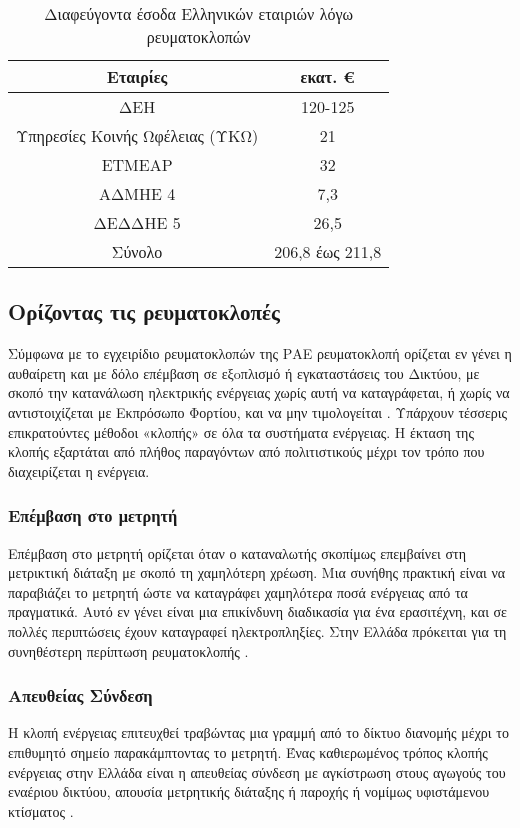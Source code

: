 \begin{table}[ht!]
\centering
\begin{tabular}{ |c||c|  }
 \hline
 Εταιρίες & εκατ. \euro\\
 \hline
 ΔΕΗ & 120-125\\
 Υπηρεσίες Κοινής Ωφέλειας (ΥΚΩ) & 21\\
 ΕΤΜΕΑΡ & 32\\
 ΑΔΜΗΕ 4 & 7,3\\
 ΔΕΔΔΗΕ 5 & 26,5\\
 \hline
 Σύνολο& 206,8 έως 211,8\\
 \hline
\end{tabular}
\caption{Διαφεύγοντα έσοδα Ελληνικών εταιριών λόγω ρευματοκλοπών}
\label{tab:lostearnings}
\end{table}
\subsection{Ορίζοντας τις ρευματοκλοπές}
Σύμφωνα με το εγχειρίδιο ρευματοκλοπών της ΡΑΕ ρευματοκλοπή ορίζεται εν γένει η αυθαίρετη και με δόλο επέμβαση σε εξoπλισμό ή εγκαταστάσεις του Δικτύου, με σκοπό την κατανάλωση ηλεκτρικής ενέργειας χωρίς αυτή να καταγράφεται, ή χωρίς να αντιστοιχίζεται με Εκπρόσωπο Φορτίου, και να μην τιμολογείται \cite{rae}. Υπάρχουν τέσσερις επικρατούντες μέθοδοι «κλοπής» σε όλα τα συστήματα ενέργειας. Η έκταση της κλοπής εξαρτάται από πλήθος παραγόντων από πολιτιστικούς μέχρι τον τρόπο που διαχειρίζεται η ενέργεια. 

\subsubsection{Επέμβαση στο μετρητή}
Επέμβαση στο μετρητή ορίζεται όταν ο καταναλωτής σκοπίμως επεμβαίνει στη μετρικτική διάταξη με σκοπό τη χαμηλότερη χρέωση. Μια συνήθης πρακτική είναι να παραβιάζει το μετρητή ώστε να καταγράφει χαμηλότερα ποσά ενέργειας από τα πραγματικά. Αυτό εν γένει είναι μια  επικίνδυνη διαδικασία για ένα ερασιτέχνη, και σε πολλές περιπτώσεις έχουν καταγραφεί ηλεκτροπληξίες. Στην Ελλάδα πρόκειται για τη συνηθέστερη περίπτωση ρευματοκλοπής \cite{rae}.
\subsubsection{Απευθείας Σύνδεση}
Η κλοπή ενέργειας επιτευχθεί τραβώντας μια γραμμή από το δίκτυο διανομής μέχρι το επιθυμητό σημείο παρακάμπτοντας το μετρητή. Ένας καθιερωμένος τρόπος κλοπής ενέργειας στην Ελλάδα είναι η απευθείας σύνδεση με αγκίστρωση στους αγωγούς του εναέριου δικτύου, απουσία μετρητικής διάταξης ή παροχής ή νομίμως υφιστάμενου κτίσματος \cite{rae}.

